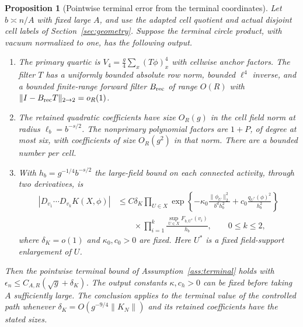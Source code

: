 \documentclass[11pt]{article}
\newtheorem{proposition}[theorem]{Proposition}
\theoremstyle{definition}
\begin{document}
\begin{proposition}[Pointwise terminal error from the terminal coordinates]
\label{prop:terminal-packing}
Let \(b\asymp n/A\) with fixed large \(A\), and use the adapted
cell quotient and actual disjoint cell labels of
Section~\ref{sec:geometry}. Suppose the terminal circle product,
with vacuum normalized to one, has the following output.
\begin{enumerate}
\item The primary quartic is \(V_4=\tfrac g4\sum_x(T\phi)_x^4\)
with cellwise anchor factors. The filter \(T\) has a uniformly
bounded absolute row norm, bounded \(\ell^4\) inverse, and a
bounded finite-range forward filter \(B_{\rm rec}\) of range
\(O(R)\) with \(\|I-B_{\rm rec}T\|_{2\to2}=o_R(1)\).
\item The retained quadratic coefficients have size \(O_R(g)\)
in the cell field norm at radius \(\ell_b=b^{-s/2}\).
The nonprimary polynomial factors are \(1+P\), of degree
at most six, with coefficients of size \(O_R(g^2)\) in that
norm. There are a bounded number per cell.
\item With \(h_b=g^{-1/4}b^{-s/2}\) the large-field bound on each
connected activity, through two derivatives, is
\begin{equation}
 \begin{aligned}
 |D_{v_1}\cdots D_{v_k} K(X,\phi)|
 &\le C\delta_K\prod_{U\in X}
   \exp\!\left\{-\kappa_0\frac{\|\phi_U\|_2^2}{b^d h_b^2}
                  +c_0\frac{q_{U^*}(\phi)^2}{h_b^2}\right\}\\
 &\qquad{}\times\prod_{i=1}^k\frac{\sup_{U\in X}F_{b,U^*}(v_i)}{h_b},
 \qquad 0\le k\le2,
 \end{aligned}
\end{equation}
where \(\delta_K=o(1)\) and \(\kappa_0,c_0>0\) are fixed.
Here \(U^*\) is a fixed field-support enlargement of \(U\).
\end{enumerate}
Then the pointwise terminal bound of Assumption~\ref{ass:terminal}
holds with \(\epsilon_n\le C_{A,R}(\sqrt g+\delta_K)\). The
output constants \(\kappa,c_h>0\) can be fixed before taking
\(A\) sufficiently large. The conclusion applies to the
terminal value of the controlled path whenever
\(\delta_K=O(g^{-9/4}\|K_N\|)\) and its retained coefficients
have the stated sizes.
\end{proposition}
\end{document}
